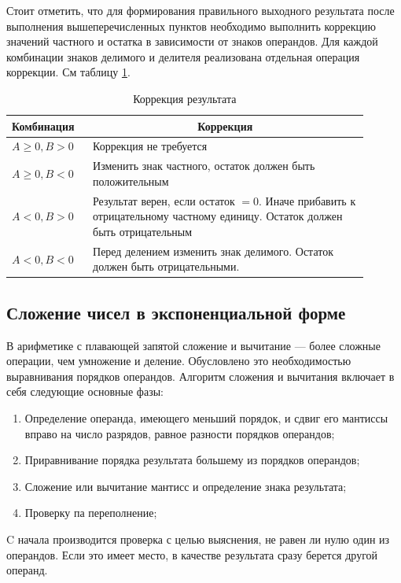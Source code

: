 \documentclass[a4paper,14pt]{extarticle}
\begin{document}
Стоит отметить, что для формирования правильного выходного результата после выполнения вышеперечисленных пунктов необходимо выполнить коррекцию значений частного и остатка в зависимости от знаков операндов. Для каждой комбинации знаков делимого и делителя реализована отдельная операция коррекции. См таблицу \ref{tab:correction4}.

\begin{table}[h!]
	\centering
	\begin{tabular}{|m{0.2\linewidth}|m{0.7\linewidth}|}
		\hline
		\textbf{Комбинация} &\multicolumn{1}{c|}{\textbf{Коррекция}}\\
		\hline
		$A\ge0, B>0 $ &Коррекция не требуется \\ 
		\hline
		$A\ge0, B<0$ & Изменить знак частного, остаток должен быть положительным\\
		\hline
		$A<0, B>0$ & Результат верен, если остаток $=0$. Иначе прибавить к отрицательному частному единицу. Остаток должен быть отрицательным\\
		\hline
		$A< 0, B< 0$ & Перед делением изменить знак делимого. Остаток должен быть отрицательными.\\
		\hline
	\end{tabular}
	\caption{Коррекция результата}
	\label{tab:correction4}
\end{table}
\subsection{Сложение чисел в экспоненциальной форме}
В арифметике с плавающей запятой сложение и вычитание — более сложные операции, чем умножение и деление. Обусловлено это необходимостью выравнивания порядков операндов. Алгоритм сложения и вычитания включает в себя следующие основные фазы:
\begin{enumerate}
	\item Определение операнда, имеющего меньший порядок, и сдвиг его мантиссы вправо на число разрядов, равное разности порядков операндов;
	\item Приравнивание порядка результата большему из порядков операндов;
	\item Сложение или вычитание мантисс и определение знака результата;
	\item Проверку па переполнение;
\end{enumerate}
C начала производится проверка с целью выяснения, не равен ли нулю один из операндов. Если это имеет место, в качестве результата сразу берется другой операнд.
\end{document}
